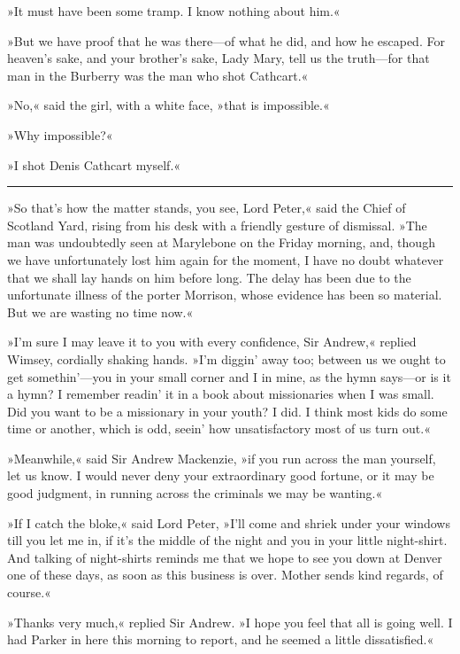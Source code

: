 »It must have been some tramp. I know nothing about him.«

»But we have proof that he was there\allowbreak---\allowbreak of what he did, and how he escaped. For heaven's sake, and your brother's sake, Lady Mary, tell us the truth\allowbreak---\allowbreak for that man in the Burberry was the man who shot Cathcart.«

»No,« said the girl, with a white face, »that is impossible.«

»Why impossible?«

»I shot Denis Cathcart myself.«

\noindent\hfil\rule{0.5\textwidth}{.4pt}\hfil

»So that's how the matter stands, you see, Lord Peter,« said the Chief of Scotland Yard, rising from his desk with a friendly gesture of dismissal. »The man was undoubtedly seen at Marylebone on the Friday morning, and, though we have unfortunately lost him again for the moment, I have no doubt whatever that we shall lay hands on him before long. The delay has been due to the unfortunate illness of the porter Morrison, whose evidence has been so material. But we are wasting no time now.«

»I'm sure I may leave it to you with every confidence, Sir Andrew,« replied Wimsey, cordially shaking hands. »I'm diggin' away too; between us we ought to get somethin'---you in your small corner and I in mine, as the hymn says\allowbreak---\allowbreak or is it a hymn? I remember readin' it in a book about missionaries when I was small. Did you want to be a missionary in your youth? I did. I think most kids do some time or another, which is odd, seein' how unsatisfactory most of us turn out.«

»Meanwhile,« said Sir Andrew Mackenzie, »if you run across the man yourself, let us know. I would never deny your extraordinary good fortune, or it may be good judgment, in running across the criminals we may be wanting.«

»If I catch the bloke,« said Lord Peter, »I'll come and shriek under your windows till you let me in, if it's the middle of the night and you in your little night-shirt. And talking of night-shirts reminds me that we hope to see you down at Denver one of these days, as soon as this business is over. Mother sends kind regards, of course.«

»Thanks very much,« replied Sir Andrew. »I hope you feel that all is going well. I had Parker in here this morning to report, and he seemed a little dissatisfied.«

